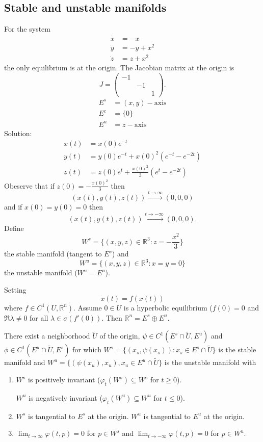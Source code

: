 \documentclass{article}
\newcommand*{\R}{\mathbb{R}}
\newcommand*{\Rn}{{\mathbb{R}^n}}
\newcommand*{\matthree}[9]{\begin{pmatrix}
    #1&#2&#3\\#4&#5&#6\\#7&#8&#9
\end{pmatrix}}
\newcommand*{\matdiagthree}[3]{\matthree{#1}{\,}{\,}{\,}{#2}{\,}{\,}{\,}{#3}}
\begin{document}
\subsection{Stable and unstable manifolds}

\begin{exam}
    For the system
    $$\begin{aligned}
        \dot x &= -x\\
        \dot y &= -y+x^2\\
        \dot z &= z+x^2
    \end{aligned}$$
    the only equilibrium is at the origin. The Jacobian matrix at the origin is
    $$J = \matdiagthree{-1}{-1}{1}.$$
    $$\begin{aligned}
        E^s &= (x,y)-\text{axis}\\
        E^c &= \{0\}\\
        E^u &= z-\text{axis}
    \end{aligned}$$
    Solution:
    $$\begin{aligned}
        x(t) &= x(0)e^{-t}\\
        y(t) &= y(0)e^{-t}+x(0)^2(e^{-t}-e^{-2t})\\
        z(t) &= z(0)e^t+\frac{x(0)^2}{3}(e^t-e^{-2t})
    \end{aligned}$$
    Obeserve that if $z(0) = -\frac{x(0)^2}{3}$ then
    $$(x(t),y(t),z(t)) \stackrel{t\to\infty}{\to} (0,0,0)$$
    and if $x(0) = y(0) = 0$ then
    $$(x(t),y(t),z(t)) \stackrel{t\to-\infty}{\to} (0,0,0).$$
    Define
    $$W^s=\{(x,y,z)\in\R^3:z=-\frac{x^2}{3}\}$$
    the stable manifold (tangent to $E^s$) and
    $$W^u=\{(x,y,z)\in\R^3:x=y=0\}$$
    the unstable manifold ($W^u = E^u$).
\end{exam}

Setting
$$\dot x(t) = f(x(t))$$
where $f\in C^1(U,\Rn)$. Assume $0\in U$ is a hyperbolic equilibrium ($f(0) = 0$ and $\Re \lambda \neq 0$ for all $\lambda \in \sigma(f'(0))$. Then $\Rn = E^s \oplus E^u$.

\begin{thm}
    There exist a neighborhood $\tilde U$ of the origin, $\psi\in C^1(E^s\cap\tilde U, E^u)$ and $\phi\in C^1(E^u\cap \tilde U, E^s)$ for which $W^s=\{(x_s,\psi(x_s)): x_s\in E^s\cap \tilde U\}$ is the stable manifold and $W^u=\{(\psi(x_u),x_u),x_u\in E^u \cap \tilde U\}$ is the unstable manifold with
    \begin{enumerate}
        \item $W^s$ is positively invariant ($\varphi_t(W^s)\subseteq W^s$ for $t \geq 0$).

        $W^u$ is negatively invariant ($\varphi_t(W^u)\subseteq W^u$ for $t \leq 0$).

        \item $W^s$ is tangential to $E^s$ at the origin. $W^u$ is tangential to $E^u$ at the origin.

        \item $\lim_{t\to\infty} \varphi(t,p) = 0$ for $p\in W^s$ and $\lim_{t\to-\infty} \varphi(t,p)=0$ for $p\in W^u$.
    \end{enumerate}
\end{thm}
\end{document}
